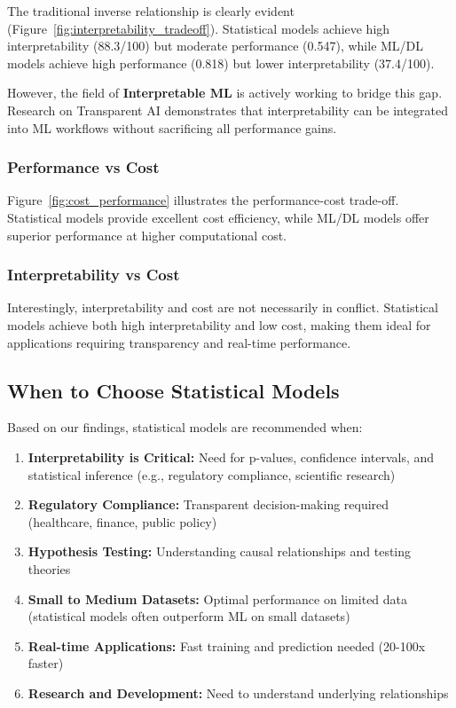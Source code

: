 \documentclass[11pt,a4paper]{article}
\begin{document}
The traditional inverse relationship is clearly evident (Figure~\ref{fig:interpretability_tradeoff}). Statistical models achieve high interpretability (88.3/100) but moderate performance (0.547), while ML/DL models achieve high performance (0.818) but lower interpretability (37.4/100).

However, the field of \textbf{Interpretable ML} is actively working to bridge this gap. Research on Transparent AI \cite{transparent_ai_2025} demonstrates that interpretability can be integrated into ML workflows without sacrificing all performance gains.

\subsubsection{Performance vs Cost}

Figure~\ref{fig:cost_performance} illustrates the performance-cost trade-off. Statistical models provide excellent cost efficiency, while ML/DL models offer superior performance at higher computational cost.

\subsubsection{Interpretability vs Cost}

Interestingly, interpretability and cost are not necessarily in conflict. Statistical models achieve both high interpretability and low cost, making them ideal for applications requiring transparency and real-time performance.

\subsection{When to Choose Statistical Models}

Based on our findings, statistical models are recommended when:

\begin{enumerate}
    \item \textbf{Interpretability is Critical:} Need for p-values, confidence intervals, and statistical inference (e.g., regulatory compliance, scientific research)
    \item \textbf{Regulatory Compliance:} Transparent decision-making required (healthcare, finance, public policy)
    \item \textbf{Hypothesis Testing:} Understanding causal relationships and testing theories
    \item \textbf{Small to Medium Datasets:} Optimal performance on limited data (statistical models often outperform ML on small datasets)
    \item \textbf{Real-time Applications:} Fast training and prediction needed (20-100x faster)
    \item \textbf{Research and Development:} Need to understand underlying relationships
\end{enumerate}
\end{document}
